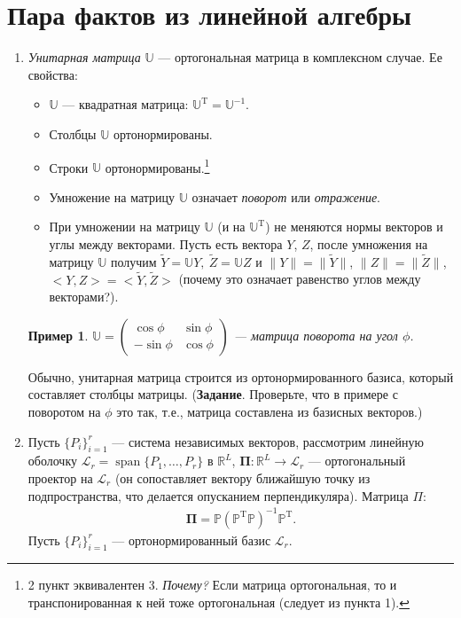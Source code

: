 \documentclass[specialist, 12pt,
subf, %
href, colorlinks=true,
substylefile = spbu.rtx,
]{disser}
\newtheorem{example}{Пример}
\DeclareMathOperator{\spn}{span}
\begin{document}
\section{Пара фактов из линейной алгебры}
\begin{enumerate}
	\item \textit{Унитарная матрица} $\mathbb{U}$ --- ортогональная матрица в комплексном случае. Ее свойства:
	\begin{itemize}
		\item $\mathbb{U}$ --- квадратная матрица: $\mathbb{U}^{\mathrm{T}} =\mathbb{U}^{-1}$.
		\item Столбцы $\mathbb{U}$ ортонормированы.
		\item Строки $\mathbb{U}$ ортонормированы.\footnote{2 пункт эквивалентен 3. \textit{Почему?} Если матрица ортогональная, то и транспонированная к ней тоже ортогональная (следует из пункта 1).}
\item Умножение на матрицу $\mathbb{U}$ означает \textit{поворот} или \textit{отражение}.
\item При умножении на матрицу $\mathbb{U}$ (и на $\mathbb{U}^\mathrm{T}$) не меняются нормы векторов и углы между векторами. Пусть есть вектора $Y$, $Z$, после умножения на матрицу $\mathbb{U}$ получим $\widetilde{Y} = \mathbb{U}Y,~ \widetilde{Z}=\mathbb{U}Z$ и $\|Y\| = \|\widetilde{Y}\|$, $\|Z\| = \|\widetilde{Z}\|$, $<Y,Z> = <\widetilde{Y}, \widetilde{Z}>$ (почему это означает равенство углов
    между векторами?).
	\end{itemize}


\begin{example}
	 $\mathbb{U} = \begin{pmatrix}
	\cos \phi & \sin \phi\\
	-\sin \phi & \cos \phi
	\end{pmatrix}$ --- матрица поворота на угол $\phi$.
\end{example}

Обычно, унитарная матрица строится из ортонормированного базиса, который составляет столбцы
матрицы. (\textbf{Задание}. Проверьте, что в примере с поворотом на $\phi$ это так, т.е., матрица составлена из базисных векторов.)

\item Пусть $\{P_i\}_{i = 1}^r$ --- система независимых векторов, рассмотрим линейную оболочку $\mathcal{L}_r = \spn\{P_1, \ldots, P_r\}$ в $\mathbb{R}^L$, $\bm\Pi: \mathbb{R}^L \rightarrow \mathcal{L}_r$ --- ортогональный проектор на $\mathcal{L}_r$ (он сопоставляет вектору ближайшую точку из подпространства,
    что делается опусканием перпендикуляра). Матрица $\Pi$:
\begin{gather*}
\bm\Pi = \mathbb{P} (\mathbb{P}^{\mathrm{T}} \mathbb{P})^{-1} \mathbb{P}^{\mathrm{T}}.
\end{gather*}
Пусть $\{P_i\}_{i = 1}^r$ --- ортонормированный базис $\mathcal{L}_r$. 



\end{enumerate}
\end{document}
